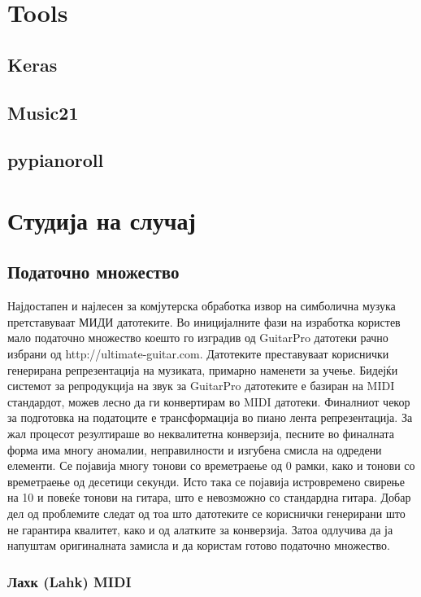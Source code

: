 \chapter{Tools}

\section{Keras}

\section{Music21}

\section{pypianoroll}

\chapter{Студија на случај}

\section{Податочно множество}

Најдостапен и најлесен за комјутерска обработка извор на симболична музука претставуваат МИДИ датотеките. Во иницијалните фази на изработка користев мало податочно множество коешто го изградив од GuitarPro датотеки рачно избрани од http://ultimate-guitar.com. Датотеките преставуваат кориснички генерирана репрезентација на музиката, примарно наменети за учење. Бидејќи системот за репродукција на звук за GuitarPro датотеките е базиран на MIDI стандардот, можев лесно да ги конвертирам во MIDI датотеки. Финалниот чекор за подготовка на податоците е трансформација во пиано лента репрезентација. За жал процесот резултираше во неквалитетна конверзија, песните во финалната форма има многу аномалии, неправилности и изгубена смисла на одредени елементи. Се појавија многу тонови со времетраење од 0 рамки, како и тонови со времетраење од десетици секунди. Исто така се појавија истровремено свирење на 10 и повеќе тонови на гитара, што е невозможно со стандардна гитара. Добар дел од проблемите следат од тоа што датотеките се кориснички генерирани што не гарантира квалитет, како и од алатките за конверзија. Затоа одлучива да ја напуштам оригиналната замисла и да користам готово податочно множество.

\subsection{Лахк (Lahk) MIDI}

